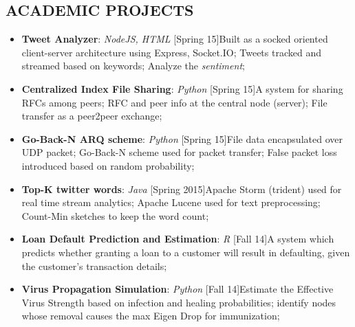\documentclass[11pt, letterpaper]{article}
\begin{document}
\begin{multicols}{2}
		\section*{ACADEMIC PROJECTS}
			
			\vspace{0.2cm}
			\begin{itemize}[nolistsep,leftmargin=*]
				\item \textbf{Tweet Analyzer}: \textit{NodeJS, HTML} \hfill [Spring 15]\newline Built as a socked oriented client-server architecture using Express, Socket.IO; Tweets tracked and streamed based on keywords; Analyze the \textit{sentiment};
				\item \textbf{Centralized Index File Sharing}: \textit{Python} \hfill [Spring 15]\newline A system for sharing RFCs among peers; RFC and peer info at the central node (server); File transfer as a peer2peer exchange; 
				\item \textbf{Go-Back-N ARQ scheme}: \textit{Python} \hfill [Spring 15]\newline File data encapsulated over UDP packet; Go-Back-N scheme used for packet transfer; False packet loss introduced based on random probability;
				\item \textbf{Top-K twitter words}: \textit{Java} \hfill [Spring 2015]\newline Apache Storm (trident) used for real time stream analytics; Apache Lucene used for text preprocessing; Count-Min sketches to keep the word count;
				\item \textbf{Loan Default Prediction and Estimation}: \textit{R} \hfill[Fall 14]\newline A system which predicts whether granting a loan to a customer will result in defaulting, given the customer's transaction details; 
				\item \textbf{Virus Propagation Simulation}: \textit{Python} \hfill [Fall 14]\newline Estimate the Effective Virus Strength based on infection and healing probabilities; identify nodes whose removal causes the max Eigen Drop for immunization;

\end{itemize}
\end{multicols}
\end{document}
